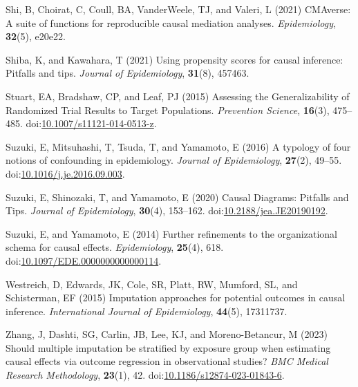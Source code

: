 \documentclass[
  singlecolumn,
  9pt]{article}
\begin{document}
\begin{CSLReferences}
Shi, B, Choirat, C, Coull, BA, VanderWeele, TJ, and Valeri, L (2021)
CMAverse: A suite of functions for reproducible causal mediation
analyses. \emph{Epidemiology}, \textbf{32}(5), e20e22.

Shiba, K, and Kawahara, T (2021) Using propensity scores for causal
inference: Pitfalls and tips. \emph{Journal of Epidemiology},
\textbf{31}(8), 457463.

Stuart, EA, Bradshaw, CP, and Leaf, PJ (2015) Assessing the
Generalizability of Randomized Trial Results to Target Populations.
\emph{Prevention Science}, \textbf{16}(3), 475--485.
doi:\href{https://doi.org/10.1007/s11121-014-0513-z}{10.1007/s11121-014-0513-z}.

Suzuki, E, Mitsuhashi, T, Tsuda, T, and Yamamoto, E (2016) A typology of
four notions of confounding in epidemiology. \emph{Journal of
Epidemiology}, \textbf{27}(2), 49--55.
doi:\href{https://doi.org/10.1016/j.je.2016.09.003}{10.1016/j.je.2016.09.003}.

Suzuki, E, Shinozaki, T, and Yamamoto, E (2020) Causal Diagrams:
Pitfalls and Tips. \emph{Journal of Epidemiology}, \textbf{30}(4),
153--162.
doi:\href{https://doi.org/10.2188/jea.JE20190192}{10.2188/jea.JE20190192}.

Suzuki, E, and Yamamoto, E (2014) Further refinements to the
organizational schema for causal effects. \emph{Epidemiology},
\textbf{25}(4), 618.
doi:\href{https://doi.org/10.1097/EDE.0000000000000114}{10.1097/EDE.0000000000000114}.

Westreich, D, Edwards, JK, Cole, SR, Platt, RW, Mumford, SL, and
Schisterman, EF (2015) Imputation approaches for potential outcomes in
causal inference. \emph{International Journal of Epidemiology},
\textbf{44}(5), 17311737.

Zhang, J, Dashti, SG, Carlin, JB, Lee, KJ, and Moreno-Betancur, M (2023)
Should multiple imputation be stratified by exposure group when
estimating causal effects via outcome regression in observational
studies? \emph{BMC Medical Research Methodology}, \textbf{23}(1), 42.
doi:\href{https://doi.org/10.1186/s12874-023-01843-6}{10.1186/s12874-023-01843-6}.

\end{CSLReferences}
\end{document}
